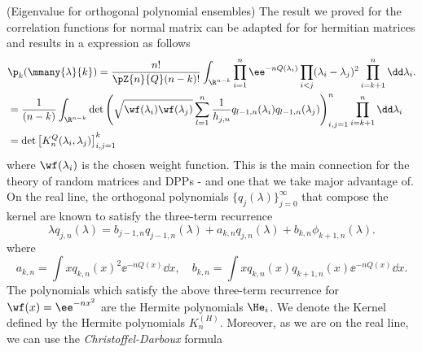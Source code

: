 \begin{exemplo} \label{Example: HermitePol} (Eigenvalue for orthogonal polynomial ensembles)
	The result we proved for the correlation functions for normal matrix can be adapted for for hermitian matrices and results in a expression as follows
	\begin{align}
	& \p_k (\mmany{\lambda}{k}) 
	=\frac{n!}{\pZ{n}{Q}(n-k)!} \int_{\R^{n-k}}  \prod_{i=1}^{n} \ee^{-n Q(\lambda_i)} \prod_{i < j} (\lambda_i - \lambda_j)^2 \prod_{i=k+1}^{n} \dd \lambda_i. \\
	&  = \frac{1}{(n-k)} \int_{\R^{n-k}}  {\det\left(\sqrt{\wf(\lambda_i)\wf(\lambda_j)} \sum_{l=1}^{n} \frac{1}{h_{j,n}} q_{l-1, n}(\lambda_i) q_{l-1, n}(\lambda_j) \right)}_{i,j=1}^{n} \prod_{i=k+1}^{n} \dd  \lambda_i \\ 
	&= \det\left[ K^Q_n(\lambda_i, \lambda_j) \right]_{i,j=1}^{k}
	\end{align}
	where $ \wf(\lambda_i)$ is the chosen weight function. This is the main connection for the theory of random matrices and DPPs - and one that we take major advantage of. On the real line, the orthogonal polynomials $\{q_j(\lambda)\}_{j=0}^\infty$ that compose the kernel are known to satisfy the three-term recurrence
	\begin{equation}
		\lambda q_{j,n}(\lambda) = b_{j-1,n} q_{j-1,n}(\lambda) + a_{k,n} q_{j, n}(\lambda) + b_{k,n} \phi_{k+1,n}(\lambda).
    \end{equation} 
    where 
    \begin{equation}
    	a_{k,n} = \int x q_{k,n}(x)^2 \ee^{-nQ(x)} \dd x, \quad b_{k,n} = \int x q_{k,n}(x) q_{k+1,n}(x) \ee^{-nQ(x)} \dd x.
    \end{equation}
	The polynomials which satisfy the above three-term recurrence for $\wf(x) = \ee^{-n x^2}$ are the Hermite polynomials $\He_i$.
	We denote the Kernel defined by the Hermite polynomials $K_n^{(H)}$. Moreover, as we are on the real line, we can use the \textit{Christoffel-Darboux} formula
	\begin{equation}

\end{equation}
\end{exemplo}
